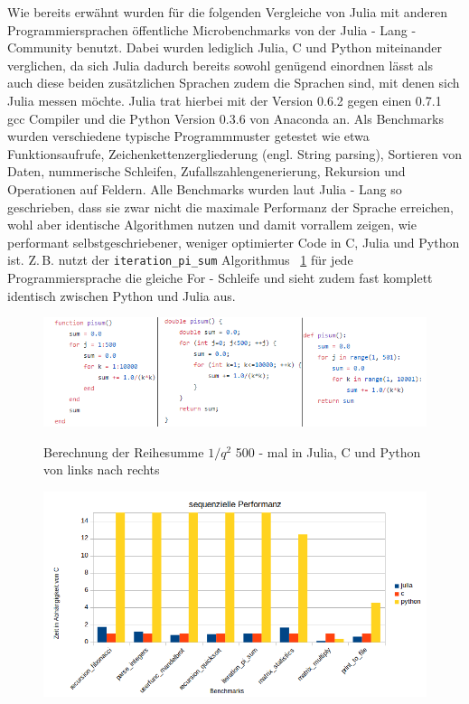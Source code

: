 \documentclass[proseminar,german,utf8]{zihpub}
\newcommand{\ZB}[0]{{Z.\,B. }}
\begin{document}
Wie bereits erwähnt wurden für die folgenden Vergleiche von Julia mit anderen Programmiersprachen öffentliche Microbenchmarks von der Julia - Lang - Community benutzt. Dabei wurden lediglich Julia, C und Python miteinander verglichen, da sich Julia dadurch bereits sowohl genügend einordnen lässt als auch diese beiden zusätzlichen Sprachen zudem die Sprachen sind, mit denen sich Julia messen möchte. Julia trat hierbei mit der Version 0.6.2 gegen einen 0.7.1 gcc Compiler und die Python Version 0.3.6 von Anaconda an. Als Benchmarks wurden verschiedene typische Programmmuster getestet wie etwa Funktionsaufrufe, Zeichenkettenzergliederung (engl. String parsing), Sortieren von Daten, nummerische Schleifen, Zufallszahlengenerierung, Rekursion und Operationen auf Feldern. Alle Benchmarks wurden laut Julia - Lang so geschrieben, dass sie zwar nicht die maximale Performanz der Sprache erreichen, wohl aber identische Algorithmen nutzen und damit vorrallem zeigen, wie performant selbstgeschriebener, weniger optimierter Code in C, Julia und Python ist. \ZB nutzt der \verb|iteration_pi_sum| Algorithmus ~\ref{fig:pisum} für jede Programmiersprache die gleiche For - Schleife und sieht zudem fast komplett identisch zwischen Python und Julia aus. \newpage

\begin{figure}[hbt!]
  \centering
  \caption{Berechnung der Reihesumme $1/q^{2}$ 500 - mal in Julia, C und Python von links nach rechts }
  \includegraphics[scale=2.5]{bilder/pisum.png}
  \label{fig:pisum}
\end{figure}

\begin{figure}[hbt!]
  \centering
  \includegraphics[scale=0.8]{bilder/sequenziell_performance.png}
  \label{fig:sequPerform}
\end{figure}
\end{document}
